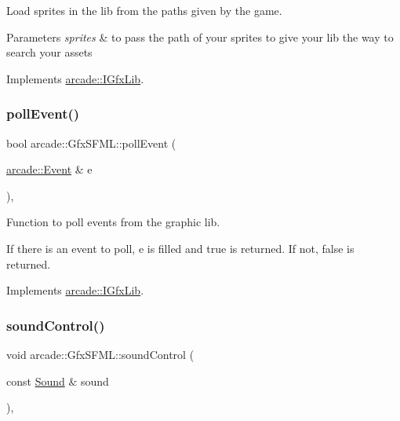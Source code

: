 Load sprites in the lib from the paths given by the game. 


\begin{DoxyParams}{Parameters}
{\em sprites} & to pass the path of your sprites to give your lib the way to search your assets \\
\hline
\end{DoxyParams}


Implements \hyperlink{classarcade_1_1_i_gfx_lib_ad5b301c8ff56c428971a2a006514b709}{arcade\+::\+I\+Gfx\+Lib}.

\mbox{\label{classarcade_1_1_gfx_s_f_m_l_a7c2d800770d4218eb38c8b01f5890aa3}} 
\subsubsection{\texorpdfstring{poll\+Event()}{pollEvent()}}
{\footnotesize\ttfamily bool arcade\+::\+Gfx\+S\+F\+M\+L\+::poll\+Event (\begin{DoxyParamCaption}\item[{\hyperlink{structarcade_1_1_event}{arcade\+::\+Event} \&}]{e }\end{DoxyParamCaption})\hspace{0.3cm}{\ttfamily [override]}, {\ttfamily [virtual]}}



Function to poll events from the graphic lib. 

If there is an event to poll, e is filled and true is returned. If not, false is returned. 

Implements \hyperlink{classarcade_1_1_i_gfx_lib_a82cdd82f168ca898ef81edf82ca6147a}{arcade\+::\+I\+Gfx\+Lib}.

\mbox{\label{classarcade_1_1_gfx_s_f_m_l_a785424b9463d487365c781bf91eda6a8}} 
\subsubsection{\texorpdfstring{sound\+Control()}{soundControl()}}
{\footnotesize\ttfamily void arcade\+::\+Gfx\+S\+F\+M\+L\+::sound\+Control (\begin{DoxyParamCaption}\item[{const \hyperlink{structarcade_1_1_sound}{Sound} \&}]{sound }\end{DoxyParamCaption})\hspace{0.3cm}{\ttfamily [override]}, {\ttfamily [virtual]}}



